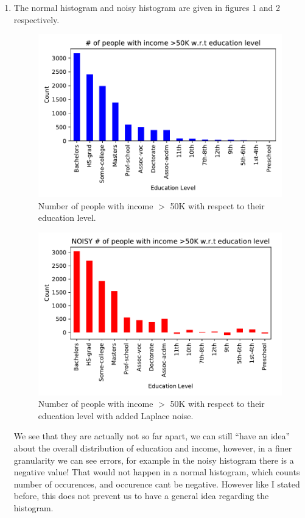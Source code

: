 \documentclass[12pt,reqno]{amsart}
\begin{document}
\begin{enumerate}[label=(\alph*)]
\item The normal histogram and noisy histogram are given in figures 1 and 2 respectively.
\begin{figure}[ht]
 	\label{fig:hist}
 	\caption{Number of people with income $>$ 50K with respect to their education level.}
 	\includegraphics[width=0.7\linewidth]{img/histogram.pdf}
\end{figure}
\begin{figure}[ht]
 	\label{fig:histnoise}
 	\caption{Number of people with income $>$ 50K with respect to their education level with added Laplace noise.}
 	\includegraphics[width=0.7\linewidth]{img/histogramNoisy.pdf}
\end{figure}
We see that they are actually not so far apart, we can still ``have an idea'' about the overall distribution of education and income, however, in a finer granularity we can see errors, for example in the noisy histogram there is a negative value! That would not happen in a normal histogram, which counts number of occurences, and occurence cant be negative. However like I stated before, this does not prevent us to have a general idea regarding the histogram.


\end{enumerate}
\end{document}
